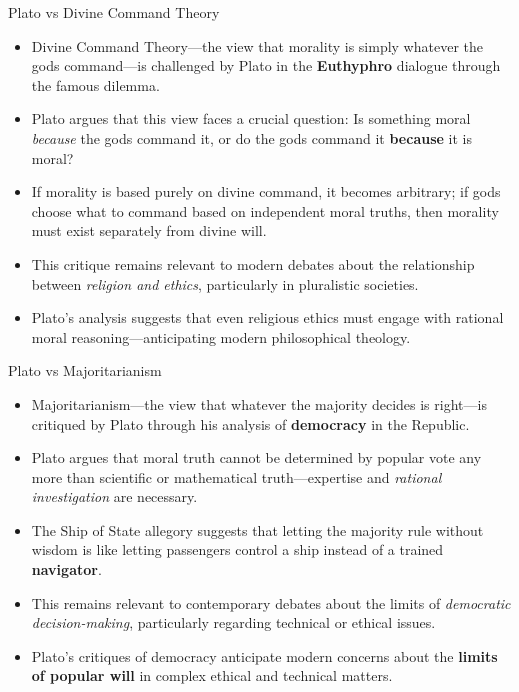 \documentclass[aspectratio=169]{beamer}
\begin{document}
\begin{frame}{Plato vs Divine Command Theory}
    \begin{itemize}
    \item Divine Command Theory—the view that morality is simply whatever the gods command—is challenged by Plato in the \textbf{Euthyphro} dialogue through the famous dilemma.
    \item Plato argues that this view faces a crucial question: Is something moral \emph{because} the gods command it, or do the gods command it \textbf{because} it is moral?
    \item If morality is based purely on divine command, it becomes arbitrary; if gods choose what to command based on independent moral truths, then morality must exist separately from divine will.
    \item This critique remains relevant to modern debates about the relationship between \emph{religion and ethics}, particularly in pluralistic societies.
    \item Plato's analysis suggests that even religious ethics must engage with rational moral reasoning—anticipating modern philosophical theology.
    \end{itemize}
    \end{frame}
    
    \begin{frame}{Plato vs Majoritarianism}
    \begin{itemize}
    \item Majoritarianism—the view that whatever the majority decides is right—is critiqued by Plato through his analysis of \textbf{democracy} in the Republic.
    \item Plato argues that moral truth cannot be determined by popular vote any more than scientific or mathematical truth—expertise and \emph{rational investigation} are necessary.
    \item The Ship of State allegory suggests that letting the majority rule without wisdom is like letting passengers control a ship instead of a trained \textbf{navigator}.
    \item This remains relevant to contemporary debates about the limits of \emph{democratic decision-making}, particularly regarding technical or ethical issues.
    \item Plato's critiques of democracy anticipate modern concerns about the \textbf{limits of popular will} in complex ethical and technical matters.
    \end{itemize}
    \end{frame}
\end{document}
